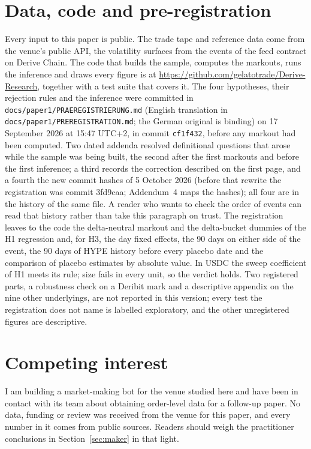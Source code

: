 \documentclass[a4paper,fleqn]{cas-dc}
\begin{document}
\section*{Data, code and pre-registration}
Every input to this paper is public. The trade tape and reference data come from the venue's public API, the
volatility surfaces from the events of the feed contract on Derive Chain. The code that builds the sample,
computes the markouts, runs the inference and draws every figure is at
\url{https://github.com/gelatotrade/Derive-Research}, together with a test suite that covers it. The
four hypotheses, their rejection rules and the inference were committed in
\texttt{docs/paper1/PRAEREGISTRIERUNG.md} (English translation in \texttt{docs/paper1/PREREGISTRATION.md}; the
German original is binding) on 17 September 2026 at 15:47 UTC+2, in commit
\texttt{cf1f432}, before any markout had been computed. Two dated addenda resolved definitional questions
that arose while the sample was being built, the second after the first markouts and before the first
inference; a third records the correction described on the first page, and a fourth the new commit hashes of
5 October 2026 (before that rewrite the registration was commit 3fd9caa; Addendum~4 maps the hashes); all four are in
the history of the same file. A reader who wants to
check the order of events can read that history rather than take this paragraph on trust. The registration
leaves to the code the delta-neutral markout and the delta-bucket dummies of the H1 regression and, for H3,
the day fixed effects, the 90 days on either side of the event, the 90 days of HYPE history before every
placebo date and the comparison of placebo estimates by absolute value. In USDC the sweep coefficient of H1 meets its
rule; size fails in every unit, so the verdict holds. Two registered
parts, a robustness check on a Deribit mark and a descriptive appendix on the nine other underlyings, are not reported
in this version; every test the registration does not name is labelled exploratory, and the other
unregistered figures are descriptive.

\section*{Competing interest}
I am building a market-making bot for the venue studied here and have been in contact with its team about
obtaining order-level data for a follow-up paper. No data, funding or review was received from the venue
for this paper, and every number in it comes from public sources. Readers should weigh the practitioner
conclusions in Section~\ref{sec:maker} in that light.
\end{document}
